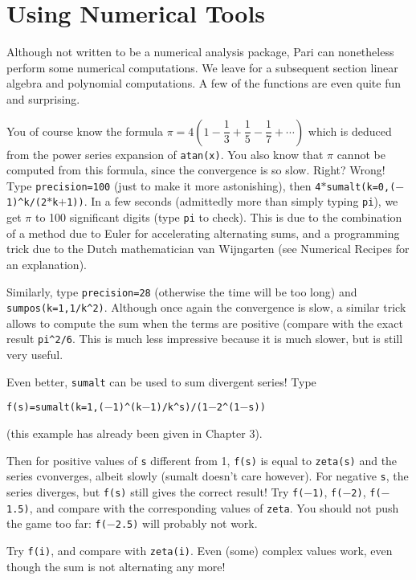 \section{Using Numerical Tools}
\medskip
Although not written to be a numerical analysis package, Pari can nonetheless
perform some numerical computations. We leave for a subsequent section
linear algebra and polynomial computations. A few of the functions are even
quite fun and surprising.

You of course know the formula $\pi=4(1-\dfrac13+\dfrac15-\dfrac17+\cdots)$
which is deduced from the power series expansion of {\tt atan(x)}. You also
know that $\pi$ cannot be computed from this formula, since the convergence
is so slow. Right? Wrong! Type {\tt\bs precision=100} (just to make it
more astonishing), then {\tt 4$*$sumalt(k=0,($-$1)\^{}k/(2$*$k$+$1))}. In a
few seconds (admittedly more than simply typing {\tt pi}), we get $\pi$ to
100 significant digits (type {\tt pi} to check). This is due to the combination
of a method due to Euler for accelerating alternating sums, and a programming
trick due to the Dutch mathematician van Wijngarten (see Numerical Recipes
for an explanation).

Similarly, type {\tt\bs precision=28} (otherwise the time will be too long)
and {\tt sumpos(k=1,1/k\^{}2)}. Although once again the convergence is
slow, a similar trick allows to compute the sum when the terms are positive
(compare with the exact result {\tt pi\^{}2/6}. This is much less impressive
because it is much slower, but is still very useful.

Even better, {\tt sumalt} can be used to sum divergent series! Type

\centerline{\tt f(s)=sumalt(k=1,($-$1)\^{}(k$-$1)/k\^{}s)/(1$-$2\^{}(1$-$s))}

(this example has already been given in Chapter 3).

Then for positive values of {\tt s} different from 1, {\tt f(s)} is equal
to {\tt zeta(s)} and the series cvonverges, albeit slowly (sumalt doesn't
care however). For negative {\tt s}, the series diverges, but {\tt f(s)}
still gives the correct result! Try {\tt f($-$1)}, {\tt f($-$2)}, {\tt f($-$1.5)},
and compare with the corresponding values of {\tt zeta}.
You should not push the game too far: {\tt f($-$2.5)} will probably not work.

Try {\tt f(i)}, and compare with {\tt zeta(i)}. Even (some) complex values 
work, even though the sum is not alternating any more!

